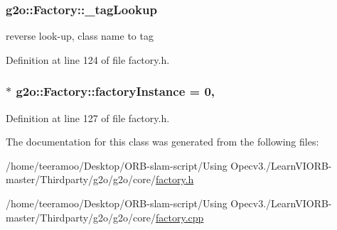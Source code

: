\subsubsection[{\texorpdfstring{\+\_\+tag\+Lookup}{_tagLookup}}]{ g2o\+::\+Factory\+::\+\_\+tag\+Lookup\hspace{0.3cm}{\ttfamily [protected]}}\hypertarget{classg2o_1_1Factory_a93fbd79ea000ed88101c1f23b19e6e2a}{}\label{classg2o_1_1Factory_a93fbd79ea000ed88101c1f23b19e6e2a}


reverse look-\/up, class name to tag 



Definition at line 124 of file factory.\+h.

\subsubsection[{\texorpdfstring{factory\+Instance}{factoryInstance}}]{ $\ast$ g2o\+::\+Factory\+::factory\+Instance = 0\hspace{0.3cm}{\ttfamily [static]}, {\ttfamily [private]}}\hypertarget{classg2o_1_1Factory_a4eab3a865dee18a71bb73246dc3e9f4b}{}\label{classg2o_1_1Factory_a4eab3a865dee18a71bb73246dc3e9f4b}


Definition at line 127 of file factory.\+h.



The documentation for this class was generated from the following files\+:\begin{DoxyCompactItemize}
\item 
/home/teeramoo/\+Desktop/\+O\+R\+B-\/slam-\/script/\+Using Opecv3./\+Learn\+V\+I\+O\+R\+B-\/master/\+Thirdparty/g2o/g2o/core/\hyperlink{factory_8h}{factory.\+h}\item 
/home/teeramoo/\+Desktop/\+O\+R\+B-\/slam-\/script/\+Using Opecv3./\+Learn\+V\+I\+O\+R\+B-\/master/\+Thirdparty/g2o/g2o/core/\hyperlink{factory_8cpp}{factory.\+cpp}\end{DoxyCompactItemize}
